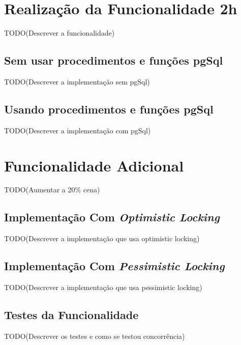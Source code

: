 %
%
\section{Realização da Funcionalidade 2h} \label{sec32}

TODO(Descrever a funcionalidade)

%
%
\subsection{Sem usar procedimentos e funções pgSql} \label{sec321}

TODO(Descrever a implementação sem pgSql)

%
%
\subsection{Usando procedimentos e funções pgSql} \label{sec322}

TODO(Descrever a implementação com pgSql)

%
%
\section{Funcionalidade Adicional} \label{sec33}

TODO(Aumentar a 20\% cena)

%
%
\subsection{Implementação Com \textit{Optimistic Locking}} \label{sec331}

TODO(Descrever a implementação que usa optimistic locking)

%
%
\subsection{Implementação Com \textit{Pessimistic Locking}} \label{sec332}

TODO(Descrever a implementação que usa pessimistic locking)

%
%
\subsection{Testes da Funcionalidade}\label{sec333}

TODO(Descrever os testes e como se testou concorrência)